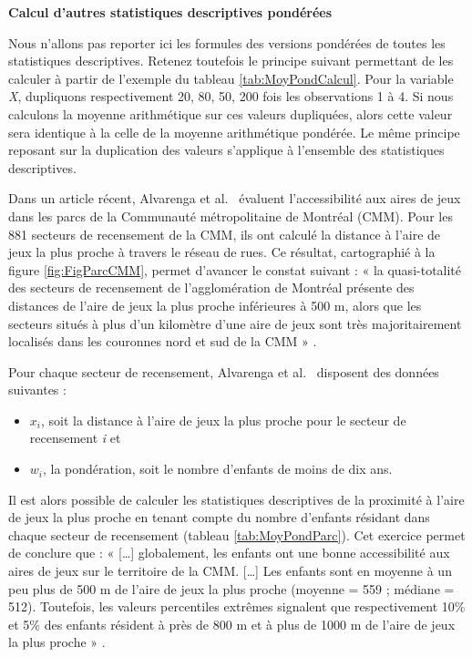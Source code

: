 \documentclass[
  11pt,
  french,
]{book}
\makeatletter
\providecommand{\tightlist}{%
  \setlength{\itemsep}{0pt}\setlength{\parskip}{0pt}}
\newenvironment{kframev}{%
\medskip{}
\setlength{\fboxsep}{.8em}
 \def\at@end@of@kframev{}%
 \ifinner\ifhmode%
  \def\at@end@of@kframev{\end{minipage}}%
  \begin{minipage}{\columnwidth}%
 \fi\fi%
 \def\FrameCommand##1{\hskip\@totalleftmargin \hskip-\fboxsep
 \colorbox{shadebluecolor}{##1}\hskip-\fboxsep
     \hskip-\linewidth \hskip-\@totalleftmargin \hskip\columnwidth}%
 \MakeFramed {\advance\hsize-\width
   \@totalleftmargin\z@ \linewidth\hsize
   \@setminipage}}%
 {\par\unskip\endMakeFramed%
 \at@end@of@kframev}
\newenvironment{rmdblock}[1]
  {
  \begin{itemize}
  \renewcommand{\labelitemi}{
    \raisebox{-.7\height}[0pt][0pt]{
      {\setkeys{Gin}{width=3em,keepaspectratio}\texttt{[image: images/\#1]}}
    }
  }
  \setlength{\fboxsep}{1em}
  \begin{kframev}
  \small
  \item
  }
  {
  \end{kframev}
  \end{itemize}
  }
\newenvironment{bloc_notes}
  {\begin{rmdblock}{notes}}
  {\end{rmdblock}}
\makeatother
\begin{document}
\begin{bloc_notes}

\textbf{Calcul d'autres statistiques descriptives pondérées}

Nous n'allons pas reporter ici les formules des versions pondérées de toutes les statistiques descriptives. Retenez toutefois le principe suivant permettant de les calculer à partir de l'exemple du tableau \ref{tab:MoyPondCalcul}. Pour la variable \emph{X}, dupliquons respectivement 20, 80, 50, 200 fois les observations 1 à 4. Si nous calculons la moyenne arithmétique sur ces valeurs dupliquées, alors cette valeur sera identique à la celle de la moyenne arithmétique pondérée. Le même principe reposant sur la duplication des valeurs s'applique à l'ensemble des statistiques descriptives.

\end{bloc_notes}

Dans un article récent, Alvarenga et al.~\citeyearpar{de2018accessibilite} évaluent l'accessibilité aux aires de jeux dans les parcs de la Communauté métropolitaine de Montréal (CMM). Pour les 881 secteurs de recensement de la CMM, ils ont calculé la distance à l'aire de jeux la plus proche à travers le réseau de rues. Ce résultat, cartographié à la figure \ref{fig:FigParcCMM}, permet d'avancer le constat suivant : « la quasi-totalité des secteurs de recensement de l'agglomération de Montréal présente des distances de l'aire de jeux la plus proche inférieures à 500 m, alors que les secteurs situés à plus d'un kilomètre d'une aire de jeux sont très majoritairement localisés dans les couronnes
nord et sud de la CMM » \citep[p.~238]{de2018accessibilite}.

Pour chaque secteur de recensement, Alvarenga et al.~\citeyearpar{de2018accessibilite} disposent des données suivantes :

\begin{itemize}
\tightlist
\item
  \(x_i\), soit la distance à l'aire de jeux la plus proche pour le secteur de recensement \emph{i} et
\item
  \(w_i\), la pondération, soit le nombre d'enfants de moins de dix ans.
\end{itemize}

Il est alors possible de calculer les statistiques descriptives de la proximité à l'aire de jeux la plus proche en tenant compte du nombre d'enfants résidant dans chaque secteur de recensement (tableau \ref{tab:MoyPondParc}). Cet exercice permet de conclure que : « {[}\ldots{]} globalement, les enfants ont une bonne accessibilité aux aires de jeux sur le territoire de la CMM. {[}\ldots{]} Les enfants sont en moyenne à un peu plus de 500 m de l'aire de jeux la plus proche (moyenne = 559 ; médiane = 512). Toutefois, les valeurs percentiles extrêmes signalent que respectivement 10\% et 5\% des enfants résident à près de 800 m et à plus de 1000 m de l'aire de jeux la plus proche » \citeyearpar[p.~236]{de2018accessibilite}.
\end{document}
